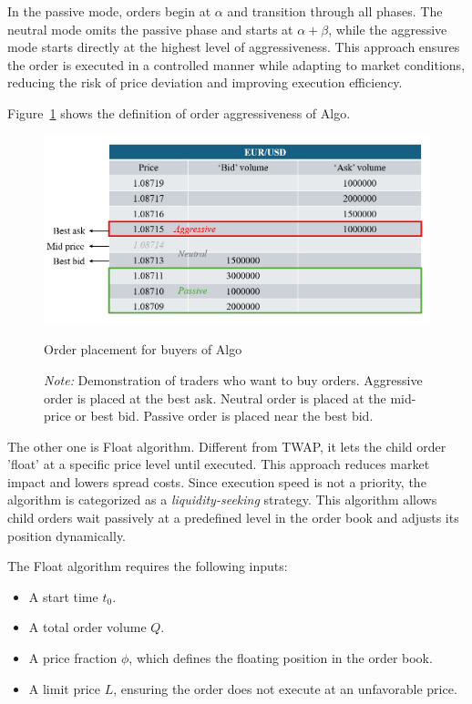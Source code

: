 
In the passive mode, orders begin at $\alpha$ and transition through all phases. The neutral mode omits the passive phase and starts at $\alpha + \beta$, while the aggressive mode starts directly at the highest level of aggressiveness. This approach ensures the order is executed in a controlled manner while adapting to market conditions, reducing the risk of price deviation and improving execution efficiency.

Figure~\ref{fig:order placement} shows the definition of order aggressiveness of Algo.

\begin{figure}[h]
    \centering
    \includegraphics[width=\linewidth]{figures/order placement.png}
    \caption{Order placement for buyers of Algo}
    \caption*{\textit{Note:} Demonstration of traders who want to buy orders. Aggressive order is placed at the best ask. Neutral order is placed at the mid-price or best bid. Passive order is placed near the best bid.}
    \label{fig:order placement}
\end{figure}

The other one is Float algorithm. Different from TWAP, it lets the child order 'float' at a specific price level until executed. This approach reduces market impact and lowers spread costs. Since execution speed is not a priority, the algorithm is categorized as a \textit{liquidity-seeking} strategy. This algorithm allows child orders wait passively at a predefined level in the order book and adjusts its position dynamically.

The Float algorithm requires the following inputs:
\begin{itemize}
    \item A start time $t_0$.
    \item A total order volume $Q$.
    \item A price fraction $\phi$, which defines the floating position in the order book.
    \item A limit price $L$, ensuring the order does not execute at an unfavorable price.
\end{itemize}


